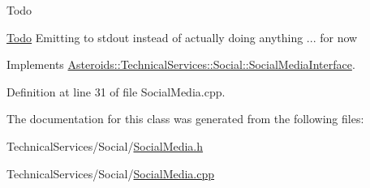 \begin{DoxyRefDesc}{Todo}
\item[\hyperlink{todo__todo000019}{Todo}]Emitting to stdout instead of actually doing anything ... for now \end{DoxyRefDesc}


Implements \hyperlink{classAsteroids_1_1TechnicalServices_1_1Social_1_1SocialMediaInterface_ac86872ff7126501fd369b27bfdf3895c}{Asteroids\+::\+Technical\+Services\+::\+Social\+::\+Social\+Media\+Interface}.



Definition at line 31 of file Social\+Media.\+cpp.



The documentation for this class was generated from the following files\+:\begin{DoxyCompactItemize}
\item 
Technical\+Services/\+Social/\hyperlink{SocialMedia_8h}{Social\+Media.\+h}\item 
Technical\+Services/\+Social/\hyperlink{SocialMedia_8cpp}{Social\+Media.\+cpp}\end{DoxyCompactItemize}
